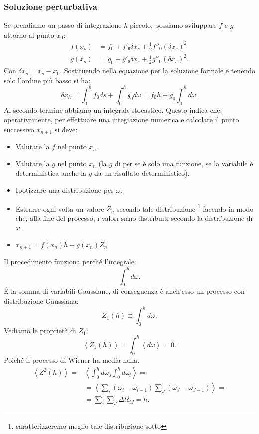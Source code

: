 \subsubsection{Soluzione perturbativa}%
\label{subsub:Soluzione perturbativa}
Se prendiamo un passo di integrazione $h$ piccolo, possiamo sviluppare $f$ e $g$ attorno al punto $x_0$:
\[\begin{aligned}
    f(x_s)   &=f_0 + f'_0\delta x_s + \frac{1}{2}f''_0(\delta x_s) ^2 \\
    g(x_s)   &= g_0 + g'_0\delta x_s + \frac{1}{2}g''_0(\delta x_s) ^2 
.\end{aligned}\]
Con $\delta x_s = x_s-x_0$. Sostituendo nella equazione per la soluzione formale e tenendo solo l'ordine più basso si ha:
\[
    \delta x_h = \int_{0}^{h} f_0ds + \int_{0}^{h} g_0d\omega  = f_0h + g_0  \int_{0}^{h} d\omega 
.\] 
Al secondo termine abbiamo un integrale stocastico. Questo indica che, operativamente, per effettuare una integrazione numerica e calcolare il punto successivo $x_{n+1}$ si deve:
\begin{itemize}
    \item Valutare la $f$ nel punto $x_n$.
    \item Valutare la $g$ nel punto $x_n$ (la $g$ di per se è solo una funzione, se la variabile è deterministica anche la $g$ da un risultato deterministico).
    \item Ipotizzare una distribuzione per $\omega$.
    \item Estrarre ogni volta un valore $Z_n$ secondo tale distribuzione
    \footnote{caratterizzeremo meglio tale distribuzione sotto}
     facendo in modo che, alla fine del processo, i valori siano distribuiti secondo la distribuzione di $\omega$.
    \item $x_{n+1} = f(x_n)h + g(x_n) Z_n$ 
\end{itemize}
Il procedimento funziona perché l'integrale:
\[
    \int_{0}^{h} d\omega 
.\] 
\'E la somma di variabili Gaussiane, di conseguenza è anch'esso un processo con distribuzione Gaussiana:
\[
    Z_1(h) \equiv \int_{0}^{h} d\omega 
.\]
Vediamo le proprietà di $Z_1$:
\[
    \left<Z_1(h)\right> = \int_{0}^{h} \left<d\omega\right> = 0
.\] 
Poiché il processo di Wiener ha media nulla.
\[\begin{aligned}
    \left<Z^2(h) \right> = &\left<\int_{0}^{h} d\omega_s \int_{0}^{h} d\omega_t \right> = \\
			   &=\left<\sum_{i}^{} \left(\omega_i-\omega_{i-1}\right) \sum_{J}^{} \left(\omega_J-\omega_{J-1}\right)\right> = \\
			   &= \sum_{i}^{} \sum_{J}^{} \Delta t\delta_{iJ} = h
.\end{aligned}\]
